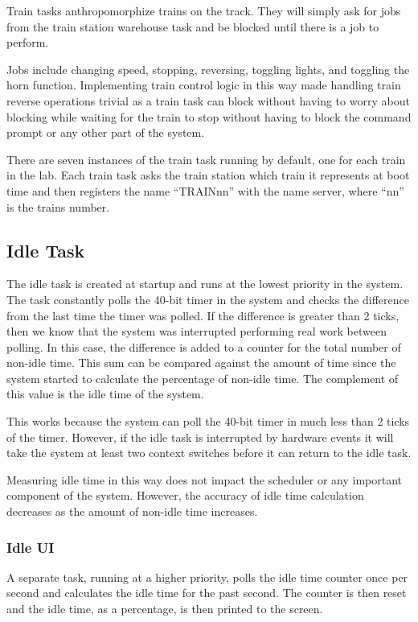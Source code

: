 \documentclass[pdftex,10pt,a4paper]{article}
\begin{document}
Train tasks anthropomorphize trains on the track. They will simply ask
for jobs from the train station warehouse task and be blocked until
there is a job to perform.

Jobs include changing speed, stopping, reversing, toggling lights, and
toggling the horn function. Implementing train control logic in this
way made handling train reverse operations trivial as a train task can
block without having to worry about blocking while waiting for the
train to stop without having to block the command prompt or any
other part of the system.

There are seven instances of the train task running by default, one
for each train in the lab. Each train task asks the train station
which train it represents at boot time and then registers the
name ``TRAINnn'' with the name server, where ``nn'' is the trains
number.

\subsection*{Idle Task}

The idle task is created at startup and runs at the lowest priority in
the system. The task constantly polls the 40-bit timer in the system
and checks the difference from the last time the timer was polled. If
the difference is greater than 2 ticks, then we know that the system
was interrupted performing real work between polling. In this case,
the difference is added to a counter for the total number of non-idle
time. This sum can be compared against the amount of time since the
system started to calculate the percentage of non-idle time. The
complement of this value is the idle time of the system.

This works because the system can poll the 40-bit timer in much less
than 2 ticks of the timer. However, if the idle task is interrupted by
hardware events it will take the system at least two context switches
before it can return to the idle task.

Measuring idle time in this way does not impact the scheduler or any
important component of the system. However, the accuracy of idle time
calculation decreases as the amount of non-idle time increases.

\subsubsection*{Idle UI}

A separate task, running at a higher priority, polls the idle time
counter once per second and calculates the idle time for the past
second. The counter is then reset and the idle time, as a percentage,
is then printed to the screen.
\end{document}
